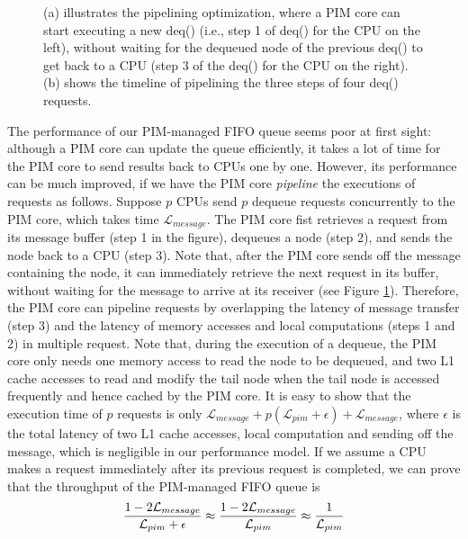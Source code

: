 \documentclass[11pt]{article}
\newcommand{\latpim} {\mathcal{L}_{pim}}
\newcommand{\latmes} {\mathcal{L}_{message}}
\begin{document}
\begin{figure}[ht!]
\centering
{}

\caption{(a) illustrates the pipelining optimization, where a PIM core can start executing a new 
deq() (i.e., step 1 of deq() for the CPU on the left), without waiting for the dequeued node of the previous deq() 
to get back to a CPU (step 3 of the deq() for the CPU on the right). 
(b) shows the timeline of pipelining the three steps of four deq() requests.}
\label{figure:queue_pipeline}
\end{figure}

The performance of our PIM-managed FIFO queue seems poor at first sight: although a PIM core can update 
the queue efficiently, it takes a lot of time for the PIM core to send results back to CPUs one by one. 
However, its performance can be much improved, if we have the PIM core \textit{pipeline} 
the executions of requests as follows. 
Suppose $p$ CPUs send $p$ dequeue requests concurrently to the PIM core, which takes time $\latmes$. 
The PIM core fist retrieves a request from its message buffer (step 1 in the figure), 
dequeues a node (step 2), and sends the node back to a CPU (step 3). 
Note that, after the PIM core sends off the message containing the node, it can immediately retrieve the next 
request in its buffer, without waiting for the message to arrive at its receiver 
(see Figure \ref{figure:queue_pipeline}). 
Therefore, the PIM core can pipeline requests by overlapping the latency of message transfer (step 3) 
and the latency of memory accesses and local computations (steps 1 and 2) in multiple request. 
Note that, during the execution of a dequeue, the PIM core only needs one memory access to read the node 
to be dequeued, and two L1 cache accesses to read and modify the tail node 
when the tail node is accessed frequently and hence cached by the PIM core.  
It is easy to show that the execution time of $p$ requests is only $\latmes + p(\latpim + \epsilon) + \latmes$, 
where $\epsilon$ is the total latency of two L1 cache accesses, local computation and sending off the message, 
which is negligible in our performance model. 
If we assume a CPU makes a request immediately after its previous request is completed, 
we can prove that the throughput of the PIM-managed FIFO queue is 
$${1 - 2\latmes \over \latpim + \epsilon} \approx {1 - 2\latmes \over \latpim} 
\approx {1 \over \latpim}$$
\end{document}
